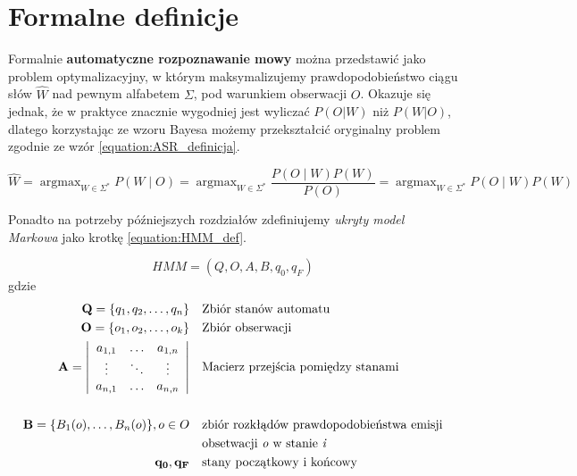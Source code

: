 \documentclass[a4paper,11pt,onecolumn,twoside,openright,titlepage]{article}
\DeclareMathOperator*{\argmax}{\arg\max}   %
\begin{document}
	\section{Formalne definicje}
	Formalnie \textbf{automatyczne rozpoznawanie mowy} można przedstawić jako problem optymalizacyjny, w którym maksymalizujemy prawdopodobieństwo ciągu słów $\hat{W}$ nad pewnym alfabetem $\Sigma$, pod warunkiem obserwacji $O$. Okazuje się jednak, że w praktyce znacznie wygodniej jest wyliczać $P(O|W)$ niż $P(W|O)$, dlatego korzystając ze wzoru Bayesa możemy przekształcić oryginalny problem zgodnie ze wzór \ref{equation:ASR_definicja}.
	
	\begin{equation}
	\hat{W}=\argmax_{W \in \Sigma^{*}}{P(W \mid O)} = \argmax_{W \in \Sigma^{*}}{\frac{P(O \mid W)P(W)}{P(O)}} = \argmax_{W \in \Sigma^{*}}{P(O \mid W)P(W)}
	\label{equation:ASR_definicja}
	\end{equation}
	
	Ponadto na potrzeby późniejszych rozdziałów zdefiniujemy \textit{ukryty model Markowa} jako krotkę \ref{equation:HMM_def}.
	
	\begin{equation}
		HMM = (Q, O, A, B, q_0, q_F)
		\label{equation:HMM_def}
	\end{equation}
	gdzie
	\begin{align*}
		\mathbf{Q}=\{q_1, q_2,\ldots,q_n\} & &&  \text{Zbiór stanów automatu} \\
		\mathbf{O}=\{o_1, o_2,\ldots,o_k\} & &&  \text{Zbiór obserwacji} \\
		\mathbf{A} =
		\left| \begin{array}{ccc}
		a_{1,1} & \ldots & a_{1,n} \\
		\vdots  & \ddots & \vdots\\
		a_{n,1} & \ldots & a_{n,n}
		\end{array} \right|
		& &&  \text{Macierz przejścia pomiędzy stanami} \\
		& && \\
		\mathbf{B}=\{B_1(o),\ldots,B_n(o)\},o \in O & && \text{zbiór rozkłądów prawdopodobieństwa emisji} \\ 
		& && \text{obsetwacji \textit{o} w stanie \textit{i}} \\
		\mathbf{q_0, q_F}				  & && \text{stany początkowy i końcowy}
	\end{align*}
\end{document}
